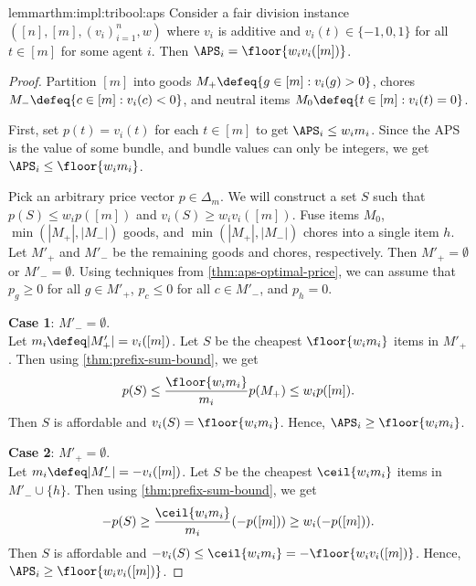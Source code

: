 \begin{restatable}{lemma}{rthm:impl:tribool:aps}
\label{thm:impl:tribool:aps}
Consider a fair division instance $([n], [m], (v_i)_{i=1}^n, w)$ where
$v_i$ is additive and $v_i(t) \in \{-1, 0, 1\}$ for all $t \in [m]$ for some agent $i$.
Then $\APS_i = \floor{w_iv_i([m])}$.
\end{restatable}
\begin{proof}
Partition $[m]$ into goods $M_+ \defeq \{g \in [m]: v_i(g) > 0\}$,
chores $M_- \defeq \{c \in [m]: v_i(c) < 0\}$, and
neutral items $M_0 \defeq \{t \in [m]: v_i(t) = 0\}$.

First, set $p(t) = v_i(t)$ for each $t \in [m]$ to get $\APS_i \le w_im_i$.
Since the APS is the value of some bundle, and bundle values can only be integers,
we get $\APS_i \le \floor{w_im_i}$.

Pick an arbitrary price vector $p \in \Delta_m$.
We will construct a set $S$ such that $p(S) \le w_ip([m])$ and $v_i(S) \ge w_iv_i([m])$.
Fuse items $M_0$, $\min(|M_+|, |M_-|)$ goods, and $\min(|M_+|, |M_-|)$ chores
into a single item $h$.
Let $M'_+$ and $M'_-$ be the remaining goods and chores, respectively.
Then $M'_+ = \emptyset$ or $M'_- = \emptyset$.
Using techniques from \cref{thm:aps-optimal-price},
we can assume \wLoG{} that $p_g \ge 0$ for all $g \in M'_+$,
$p_c \le 0$ for all $c \in M'_-$, and $p_h = 0$.

\textbf{Case 1}: $M'_- = \emptyset$.
\\ Let $m_i \defeq |M'_+| = v_i([m])$.
Let $S$ be the cheapest $\floor{w_im_i}$ items in $M'_+$.
Then using \cref{thm:prefix-sum-bound}, we get
\[ p(S) \le \frac{\floor{w_im_i}}{m_i}p(M_+) \le w_ip([m]). \]
Then $S$ is affordable and $v_i(S) = \floor{w_im_i}$.
Hence, $\APS_i \ge \floor{w_im_i}$.

\textbf{Case 2}: $M'_+ = \emptyset$.
\\ Let $m_i \defeq |M'_-| = -v_i([m])$.
Let $S$ be the cheapest $\ceil{w_im_i}$ items in $M'_- \cup \{h\}$.
Then using \cref{thm:prefix-sum-bound}, we get
\[ -p(S) \ge \frac{\ceil{w_im_i}}{m_i}(-p([m])) \ge w_i(-p([m])). \]
Then $S$ is affordable and $-v_i(S) \le \ceil{w_im_i} = -\floor{w_iv_i([m])}$.
Hence, $\APS_i \ge \floor{w_iv_i([m])}$.
\end{proof}

